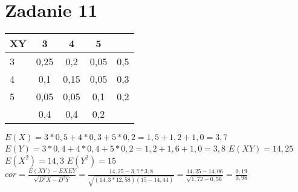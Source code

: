\section*{Zadanie 11}
\begin{table}
\centering
\begin{tabular}{|l|c|c|c|r|}
\hline
XY &3 &4 &5 & \\ \hline
3 &0,25 &0,2 &0,05 &0,5 \\ \hline
4 &0,1 &0,15 &0,05 &0,3\\ \hline
5 &0,05 &0,05 &0,1 &0,2\\ \hline
$ $ &0,4 &0,4 &0,2 & \\ \hline
\end{tabular}
\end{table}
$E(X) = 3*0,5 + 4*0,3 + 5*0,2 = 1,5 + 1,2 + 1,0 = 3,7$\newline
$E(Y) = 3*0,4 + 4*0,4 + 5*0,2 = 1,2 + 1,6 + 1,0 = 3,8$\newline
$E(XY) = 14,25$\newline
$E(X^2) = 14,3$\newline
$E(Y^2) = 15$\newline
$cor = \frac{E(XY) - EXEY}{\sqrt{D^2X - D^2Y}} = \frac{14,25 - 3,7*3,8}{\sqrt{(14,3*12,58)(15 - 14,44)}} = \frac{14,25 - 14,06}{\sqrt{1,72 - 0,56}} = \frac{0,19}{0,98}$
